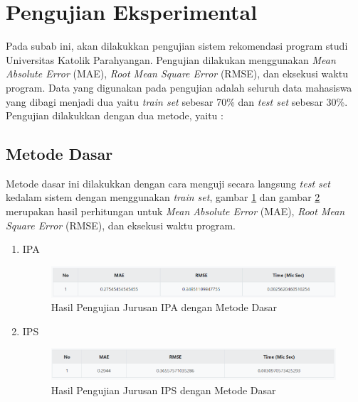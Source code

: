 \section{Pengujian Eksperimental}
\label{sec:pengujian eksperimental}

Pada subab ini, akan dilakukkan pengujian sistem rekomendasi program studi Universitas Katolik Parahyangan. Pengujian dilakukan menggunakan \textit{Mean Absolute Error} (MAE), \textit{Root Mean Square Error} (RMSE), dan eksekusi waktu program. Data yang digunakan pada pengujian adalah seluruh data mahasiswa yang dibagi menjadi dua yaitu \textit{train set} sebesar 70\% dan \textit{test set} sebesar 30\%. Pengujian dilakukkan dengan dua metode, yaitu : 

\subsection{Metode Dasar}
\label{subsec: metode dasar}

Metode dasar ini dilakukkan dengan cara menguji secara langsung \textit{test set} kedalam sistem dengan menggunakan \textit{train set}, gambar \ref{fig:pengujian ipa dasar} dan gambar \ref{fig:pengujian ips dasar} merupakan hasil perhitungan untuk \textit{Mean Absolute Error} (MAE), \textit{Root Mean Square Error} (RMSE), dan eksekusi waktu program.

\begin{enumerate}
    \item IPA
        \begin{figure}[H]
            \centering
            \includegraphics[width = 14cm, height =2 cm]{doc/DokumenSkripsi/Gambar/gambar55.PNG}
            \caption{Hasil Pengujian Jurusan IPA dengan Metode Dasar}
            \label{fig:pengujian ipa dasar}
        \end{figure}
        
    \item IPS
        \begin{figure}[H]
            \centering
            \includegraphics[width = 14cm, height =2 cm]{doc/DokumenSkripsi/Gambar/gambar56.PNG}
            \caption{Hasil Pengujian Jurusan IPS dengan Metode Dasar}
            \label{fig:pengujian ips dasar}
        \end{figure}
    
\end{enumerate}

